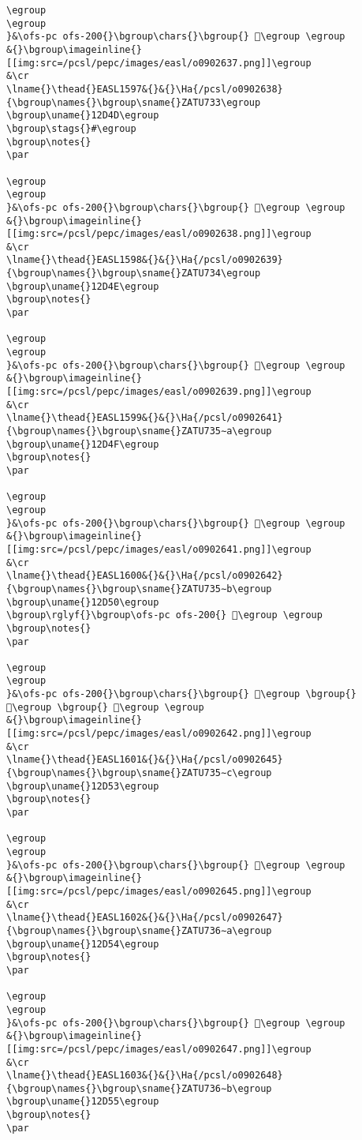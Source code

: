 \begin{verbatim}
\egroup
\egroup
}&\ofs-pc ofs-200{}\bgroup\chars{}\bgroup{} 𒵌\egroup \egroup
&{}\bgroup\imageinline{}[[img:src=/pcsl/pepc/images/easl/o0902637.png]]\egroup
&\cr
\lname{}\thead{}EASL1597&{}&{}\Ha{/pcsl/o0902638}{\bgroup\names{}\bgroup\sname{}ZATU733\egroup
\bgroup\uname{}12D4D\egroup
\bgroup\stags{}#\egroup
\bgroup\notes{}
\par 

\egroup
\egroup
}&\ofs-pc ofs-200{}\bgroup\chars{}\bgroup{} 𒵍\egroup \egroup
&{}\bgroup\imageinline{}[[img:src=/pcsl/pepc/images/easl/o0902638.png]]\egroup
&\cr
\lname{}\thead{}EASL1598&{}&{}\Ha{/pcsl/o0902639}{\bgroup\names{}\bgroup\sname{}ZATU734\egroup
\bgroup\uname{}12D4E\egroup
\bgroup\notes{}
\par 

\egroup
\egroup
}&\ofs-pc ofs-200{}\bgroup\chars{}\bgroup{} 𒵎\egroup \egroup
&{}\bgroup\imageinline{}[[img:src=/pcsl/pepc/images/easl/o0902639.png]]\egroup
&\cr
\lname{}\thead{}EASL1599&{}&{}\Ha{/pcsl/o0902641}{\bgroup\names{}\bgroup\sname{}ZATU735∼a\egroup
\bgroup\uname{}12D4F\egroup
\bgroup\notes{}
\par 

\egroup
\egroup
}&\ofs-pc ofs-200{}\bgroup\chars{}\bgroup{} 𒵏\egroup \egroup
&{}\bgroup\imageinline{}[[img:src=/pcsl/pepc/images/easl/o0902641.png]]\egroup
&\cr
\lname{}\thead{}EASL1600&{}&{}\Ha{/pcsl/o0902642}{\bgroup\names{}\bgroup\sname{}ZATU735∼b\egroup
\bgroup\uname{}12D50\egroup
\bgroup\rglyf{}\bgroup\ofs-pc ofs-200{} 𒵐\egroup \egroup
\bgroup\notes{}
\par 

\egroup
\egroup
}&\ofs-pc ofs-200{}\bgroup\chars{}\bgroup{} 𒵒\egroup \bgroup{} 𒵐\egroup \bgroup{} 𒵑\egroup \egroup
&{}\bgroup\imageinline{}[[img:src=/pcsl/pepc/images/easl/o0902642.png]]\egroup
&\cr
\lname{}\thead{}EASL1601&{}&{}\Ha{/pcsl/o0902645}{\bgroup\names{}\bgroup\sname{}ZATU735∼c\egroup
\bgroup\uname{}12D53\egroup
\bgroup\notes{}
\par 

\egroup
\egroup
}&\ofs-pc ofs-200{}\bgroup\chars{}\bgroup{} 𒵓\egroup \egroup
&{}\bgroup\imageinline{}[[img:src=/pcsl/pepc/images/easl/o0902645.png]]\egroup
&\cr
\lname{}\thead{}EASL1602&{}&{}\Ha{/pcsl/o0902647}{\bgroup\names{}\bgroup\sname{}ZATU736∼a\egroup
\bgroup\uname{}12D54\egroup
\bgroup\notes{}
\par 

\egroup
\egroup
}&\ofs-pc ofs-200{}\bgroup\chars{}\bgroup{} 𒵔\egroup \egroup
&{}\bgroup\imageinline{}[[img:src=/pcsl/pepc/images/easl/o0902647.png]]\egroup
&\cr
\lname{}\thead{}EASL1603&{}&{}\Ha{/pcsl/o0902648}{\bgroup\names{}\bgroup\sname{}ZATU736∼b\egroup
\bgroup\uname{}12D55\egroup
\bgroup\notes{}
\par 


\end{verbatim}
